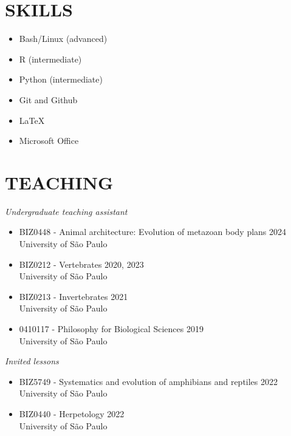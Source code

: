 \documentclass[margin, 10pt]{res} %
\begin{document}
\begin{resume}

\section{SKILLS}

\begin{itemize}
\item Bash/Linux (advanced)
\item R (intermediate)
\item Python (intermediate)
\item Git and Github
\item LaTeX
\item Microsoft Office
\end{itemize}


\section{TEACHING}
{\sl Undergraduate teaching assistant}
\begin{itemize}
\item BIZ0448 - Animal architecture: Evolution of metazoan body plans \hfill 2024 \\
University of São Paulo
\item BIZ0212 - Vertebrates \hfill 2020, 2023 \\
University of São Paulo
\item BIZ0213 - Invertebrates \hfill 2021 \\
University of São Paulo
\item 0410117 - Philosophy for Biological Sciences \hfill 2019 \\
University of São Paulo
\end{itemize}

{\sl Invited lessons}
\begin{itemize}
\item BIZ5749 - Systematics and evolution of amphibians and reptiles \hfill 2022 \\
University of São Paulo
\item BIZ0440 - Herpetology \hfill 2022 \\
University of São Paulo
\end{itemize}



\end{resume}
\end{document}
